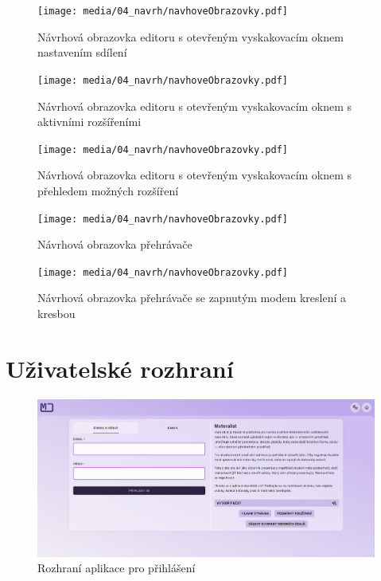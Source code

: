 \begin{figure}[ht!]
    \centering
    \texttt{[image: media/04\_navrh/navhoveObrazovky.pdf]}
    \caption{Návrhová obrazovka editoru s otevřeným vyskakovacím oknem nastavením sdílení}
\end{figure}

\begin{figure}[ht!]
    \centering
    \texttt{[image: media/04\_navrh/navhoveObrazovky.pdf]}
    \caption{Návrhová obrazovka editoru s otevřeným vyskakovacím oknem s aktivními rozšířeními}
\end{figure}

\begin{figure}[ht!]
    \centering
    \texttt{[image: media/04\_navrh/navhoveObrazovky.pdf]}
    \caption{Návrhová obrazovka editoru s otevřeným vyskakovacím oknem s přehledem možných rozšíření}
\end{figure}

\begin{figure}[ht!]
    \centering
    \texttt{[image: media/04\_navrh/navhoveObrazovky.pdf]}
    \caption{Návrhová obrazovka přehrávače}
\end{figure}

\begin{figure}[ht!]
    \centering
    \texttt{[image: media/04\_navrh/navhoveObrazovky.pdf]}
    \caption{Návrhová obrazovka přehrávače se zapnutým modem kreslení a kresbou}
\end{figure}




\chapter{Uživatelské rozhraní}\label{appendix:uzivatelskeRozhrani}


\begin{figure}[ht!]
    \centering
    \includegraphics[width=1\textwidth,page=1]{media/appendix/uzivatelskeProstredi.pdf}
    \caption{Rozhraní aplikace pro přihlášení}
\end{figure}

